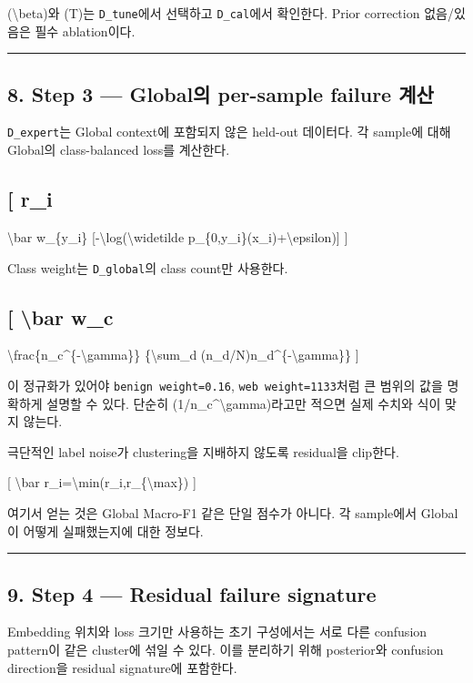 (\textbackslash{}beta)와 (T)는 \texttt{D\_\allowbreak{}\allowbreak{}tune}에서 선택하고 \texttt{D\_\allowbreak{}\allowbreak{}cal}에서 확인한다. Prior correction 없음/\allowbreak{}있음은 필수 ablation이다.


\medskip\hrule\medskip
\subsection{8. Step 3 — Global의 per-sample failure 계산}
\texttt{D\_\allowbreak{}\allowbreak{}expert\allowbreak{}}는 Global context에 포함되지 않은 held-out 데이터다. 각 sample에 대해 Global의 class-balanced loss를 계산한다.

\subsection{[ r\_\allowbreak{}i}
\textbackslash{}bar w\_\allowbreak{}\{y\_\allowbreak{}i\} [-\textbackslash{}log(\textbackslash{}widetilde p\_\allowbreak{}\{0,y\_\allowbreak{}i\}(x\_\allowbreak{}i)+\allowbreak{}\textbackslash{}epsilon)] ]

Class weight는 \texttt{D\_\allowbreak{}\allowbreak{}global\allowbreak{}}의 class count만 사용한다.

\subsection{[ \textbackslash{}bar w\_\allowbreak{}c}
\textbackslash{}frac\{n\_\allowbreak{}c\textasciicircum{}\{-\textbackslash{}gamma\}\} \{\textbackslash{}sum\_\allowbreak{}d (n\_\allowbreak{}d/\allowbreak{}N)n\_\allowbreak{}d\textasciicircum{}\{-\textbackslash{}gamma\}\} ]

이 정규화가 있어야 \texttt{benign w\allowbreak{}eight=\allowbreak{}\allowbreak{}0.\allowbreak{}16}, \texttt{web weig\allowbreak{}ht=\allowbreak{}\allowbreak{}1133}처럼 큰 범위의 값을 명확하게 설명할 수 있다. 단순히 (1/\allowbreak{}n\_\allowbreak{}c\textasciicircum{}\textbackslash{}gamma)라고만 적으면 실제 수치와 식이 맞지 않는다.

극단적인 label noise가 clustering을 지배하지 않도록 residual을 clip한다.

[ \textbackslash{}bar r\_\allowbreak{}i=\allowbreak{}\textbackslash{}min(r\_\allowbreak{}i,r\_\allowbreak{}\{\textbackslash{}max\}) ]

여기서 얻는 것은 Global Macro-F1 같은 단일 점수가 아니다. 각 sample에서 Global이 어떻게 실패했는지에 대한 정보다.


\medskip\hrule\medskip
\subsection{9. Step 4 — Residual failure signature}
Embedding 위치와 loss 크기만 사용하는 초기 구성에서는 서로 다른 confusion pattern이 같은 cluster에 섞일 수 있다. 이를 분리하기 위해 posterior와 confusion direction을 residual signature에 포함한다.


